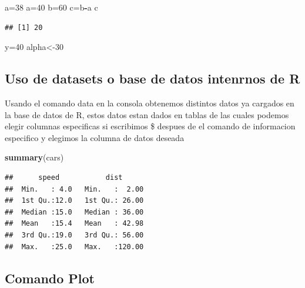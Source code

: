 \documentclass[]{llncs}
\newenvironment{Shaded}{\begin{snugshade}}{\end{snugshade}}
\newcommand{\DecValTok}[1]{\textcolor[rgb]{0.00,0.00,0.81}{#1}}
\newcommand{\FunctionTok}[1]{\textcolor[rgb]{0.13,0.29,0.53}{\textbf{#1}}}
\newcommand{\NormalTok}[1]{#1}
\newcommand{\OtherTok}[1]{\textcolor[rgb]{0.56,0.35,0.01}{#1}}
\newcommand{\SpecialCharTok}[1]{\textcolor[rgb]{0.81,0.36,0.00}{\textbf{#1}}}
\begin{document}
\begin{Shaded}
\begin{Highlighting}[]
\NormalTok{a}\OtherTok{=}\DecValTok{38}
\NormalTok{a}\OtherTok{=}\DecValTok{40}
\NormalTok{b}\OtherTok{=}\DecValTok{60}
\NormalTok{c}\OtherTok{=}\NormalTok{b}\SpecialCharTok{{-}}\NormalTok{a}
\NormalTok{c}
\end{Highlighting}
\end{Shaded}

\begin{verbatim}
## [1] 20
\end{verbatim}

\begin{Shaded}
\begin{Highlighting}[]
\NormalTok{y}\OtherTok{=}\DecValTok{40}
\NormalTok{alpha}\OtherTok{\textless{}{-}}\DecValTok{30}
\end{Highlighting}
\end{Shaded}

\subsection{Uso de datasets o base de datos intenrnos de
R}\label{uso-de-datasets-o-base-de-datos-intenrnos-de-r}

Usando el comando data en la consola obtenemos distintos datos ya
cargados en la base de datos de R, estos datos estan dados en tablas de
las cuales podemos elegir columnas especificas si escribimos \$ despues
de el comando de informacion especifico y elegimos la columna de datos
deseada

\begin{Shaded}
\begin{Highlighting}[]
\FunctionTok{summary}\NormalTok{(cars)}
\end{Highlighting}
\end{Shaded}

\begin{verbatim}
##      speed           dist       
##  Min.   : 4.0   Min.   :  2.00  
##  1st Qu.:12.0   1st Qu.: 26.00  
##  Median :15.0   Median : 36.00  
##  Mean   :15.4   Mean   : 42.98  
##  3rd Qu.:19.0   3rd Qu.: 56.00  
##  Max.   :25.0   Max.   :120.00
\end{verbatim}

\subsection{Comando Plot}\label{comando-plot}
\end{document}
